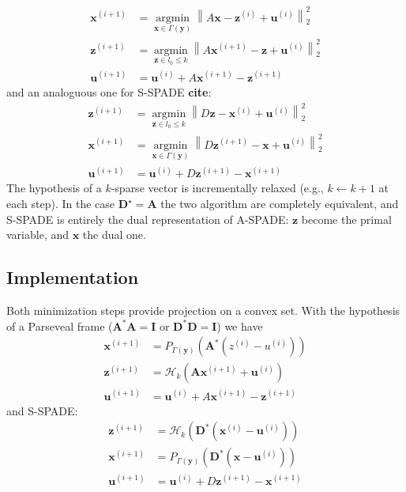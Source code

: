 \documentclass[twocolumn]{scrartcl}
\renewcommand{\vec}[1]{\boldsymbol{#1}}
\begin{document}
\begin{subequations}
  \label{eq:ASPADE-step}
  \begin{align}
    \vec{x}^{(i+1)}&=\underset{\vec{x}\in \Gamma(\vec{y})}{\operatorname{argmin}}\left\|A \vec{x}-\vec{z}^{(i)}+\vec{u}^{(i)}\right\|_{2}^{2} \\
    \vec{z}^{(i+1)}&=\underset{\vec{z}\in l_{0}\le k}{\operatorname{argmin}}\left\|A \vec{x}^{(i+1)}-\vec{z}+\vec{u}^{(i)}\right\|_{2}^{2}\\
    \vec{u}^{(i+1)}&=\vec{u}^{(i)}+A \vec{x}^{(i+1)}-\vec{z}^{(i+1)}
  \end{align}
\end{subequations}
and an analoguous one for S-SPADE \textbf{cite}:
\begin{subequations}
  \label{eq:SSPADE-step}
  \begin{align}
    \vec{z}^{(i+1)}&=\underset{\vec{z}\in l_{0}\le k}{\operatorname{argmin}}\left\|D \vec{z}-\vec{x}^{(i)}+\vec{u}^{(i)}\right\|_{2}^{2}\\
    \vec{x}^{(i+1)}&=\underset{\vec{x}\in \Gamma(\vec{y})}{\operatorname{argmin}}\left\|D \vec{z}^{(i+1)}-\vec{x}+\vec{u}^{(i)}\right\|_{2}^{2}\\
    \vec{u}^{(i+1)}&=\vec{u}^{(i)}+D \vec{z}^{(i+1)}-\vec{x}^{(i+1)}
  \end{align}
\end{subequations}
The hypothesis of a \(k\)-sparse vector is incrementally relaxed (e.g., $k \leftarrow k+1$ at each step). In the case \(\vec{D}^{\star} = \vec{A}\)  the two algorithm are completely equivalent, and S-SPADE is entirely the dual representation of A-SPADE: \(\vec{z}\) become the primal variable, and \(\vec{x}\) the dual one.


\subsection{Implementation}

Both minimization steps provide projection on a convex set. With the hypothesis of  a Parseveal frame  (\(\vec{A^{*}A}= \vec{I}\) or \(\vec{D^{*}D} = \vec{I}\)) we have
\begin{subequations}
  \label{eq:ASPADE-step2}
  \begin{align}
    \vec{x}^{(i+1)}&= P_{\Gamma(\vec{y})}(\vec{A}^{*}(z^{(i)}-u^{(i)}))\\
    \vec{z}^{(i+1)}&=\mathcal{H}_{k}(\vec{A}\vec{x}^{(i+1)}+\vec{u}^{(i)})\\
    \vec{u}^{(i+1)}&=\vec{u}^{(i)}+A \vec{x}^{(i+1)}-\vec{z}^{(i+1)}
  \end{align}
\end{subequations}
and S-SPADE:
\begin{subequations}
  \label{eq:SSPADE-step2}
  \begin{align}
    \vec{z}^{(i+1)}&=\mathcal{H}_{k}(\vec{D}^{*}(\vec{x}^{(i)}-\vec{u}^{(i)}))\\
    \vec{x}^{(i+1)}&=P_{\Gamma(\vec{y})}(\vec{D}^{*}(\vec{x}-\vec{u}^{(i)}))\\
    \vec{u}^{(i+1)}&=\vec{u}^{(i)}+D \vec{z}^{(i+1)}-\vec{x}^{(i+1)}
  \end{align}
\end{subequations}
\end{document}
